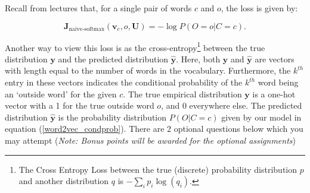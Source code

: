 Recall from lectures that, for a single pair of words $c$ and $o$, the loss is given by:

\begin{equation} 
\bm J_{\text{naive-softmax}}(\bm v_c, o, \bm U) = -\log P(O=o \vert C=c).
\label{naive-softmax}
\end{equation}

Another way to view this loss is as the cross-entropy\footnote{The Cross Entropy Loss between the true (discrete) probability distribution $p$ and another distribution $q$ is $-\sum_i p_i \log(q_i)$.} between the true distribution $\bm y$ and the predicted distribution $\hat{\bm y}$. 
Here, both $\bm y$ and $\hat{\bm y}$ are vectors with length equal to the number of words in the vocabulary.
Furthermore, the $k^{th}$ entry in these vectors indicates the conditional probability of the $k^{th}$ word being an `outside word' for the given $c$. 
The true empirical distribution $\bm y$ is a one-hot vector with a 1 for the true outside word $o$, and 0 everywhere else. 
The predicted distribution $\hat{\bm y}$ is the probability distribution $P(O \vert C=c)$ given by our model in equation (\ref{word2vec_condprob}). There are 2 optional questions below which you may attempt (\emph{Note: Bonus points will be awarded for the optional assignments})

